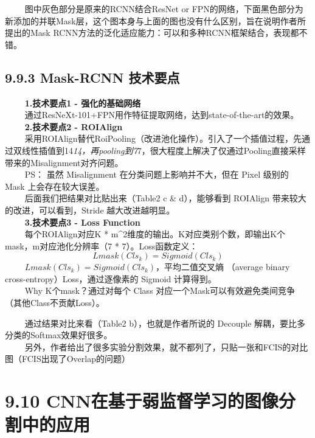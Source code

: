    图中灰色部分是原来的RCNN结合ResNet or
FPN的网络，下面黑色部分为新添加的并联Mask层，这个图本身与上面的图也没有什么区别，旨在说明作者所提出的Mask
RCNN方法的泛化适应能力：可以和多种RCNN框架结合，表现都不错。

\subsection{9.9.3 Mask-RCNN
技术要点}\label{mask-rcnn-ux6280ux672fux8981ux70b9}

   \textbf{1.技术要点1 - 强化的基础网络}\\
   通过ResNeXt-101+FPN用作特征提取网络，达到state-of-the-art的效果。\\
   \textbf{2.技术要点2 - ROIAlign}\\
  
采用ROIAlign替代RoiPooling（改进池化操作）。引入了一个插值过程，先通过双线性插值到14\emph{14，再pooling到7}7，很大程度上解决了仅通过Pooling直接采样带来的Misalignment对齐问题。\\
   PS： 虽然 Misalignment 在分类问题上影响并不大，但在 Pixel 级别的 Mask
上会存在较大误差。\\
   后面我们把结果对比贴出来（Table2 c \& d），能够看到 ROIAlign
带来较大的改进，可以看到，Stride 越大改进越明显。\\
   \textbf{3.技术要点3 - Loss Function}\\
   每个ROIAlign对应K *
m\^{}2维度的输出。K对应类别个数，即输出K个mask，m对应池化分辨率（7 *
7）。Loss函数定义： \[
Lmask(Cls_k)=Sigmoid(Cls_k)
\]    \(Lmask(Cls_k) = Sigmoid (Cls_k)\)，平均二值交叉熵 （average
binary cross-entropy）Loss，通过逐像素的 Sigmoid 计算得到。\\
   Why K个mask？通过对每个 Class
对应一个Mask可以有效避免类间竞争（其他Class不贡献Loss）。

   通过结果对比来看（Table2 b），也就是作者所说的 Decouple
解耦，要比多分类的Softmax效果好很多。\\
  
另外，作者给出了很多实验分割效果，就不都列了，只贴一张和FCIS的对比图（FCIS出现了Overlap的问题）

\begin{figure}
\centering
\end{figure}

\section{9.10
CNN在基于弱监督学习的图像分割中的应用}\label{cnnux5728ux57faux4e8eux5f31ux76d1ux7763ux5b66ux4e60ux7684ux56feux50cfux5206ux5272ux4e2dux7684ux5e94ux7528}

